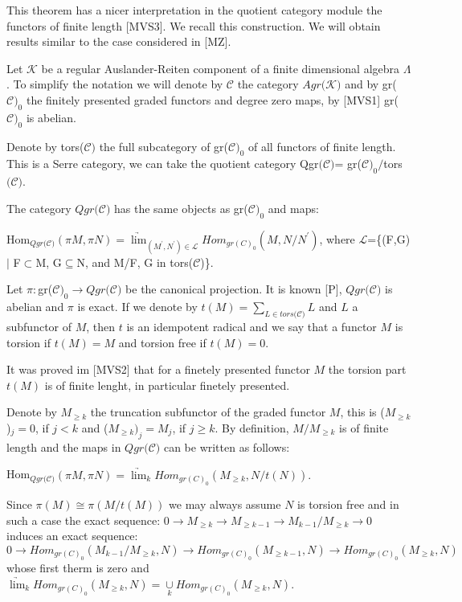 \documentclass{amsart}
\theoremstyle{plain}
\numberwithin{equation}{section}
\begin{document}
This theorem has a nicer interpretation in the quotient category module the
functors of finite length [MVS3]. We recall this construction. We will
obtain results similar to the case considered in [MZ].

\bigskip Let $\mathcal{K}$ be a regular Auslander-Reiten component of a
finite dimensional algebra $\Lambda $. To simplify the notation we will
denote by $\mathcal{C}$ the category $Agr(\mathcal{K)}$ and by gr($\mathcal{C)}_{0}$ the finitely presented graded functors and degree zero maps, by
[MVS1] gr($\mathcal{C)}_{0}$ is abelian.

Denote by tors($\mathcal{C)}$ the full subcategory of gr($\mathcal{C)}_{0}$
of all functors of finite length. This is a Serre category, we can take the
quotient category Qgr$(\mathcal{C)}$= gr($\mathcal{C)}_{0}/$tors$(\mathcal{C)}$.

The category $Qgr(\mathcal{C)}$ has the same objects as gr($\mathcal{C)}_{0}$
and maps:

Hom$_{Qgr(\mathcal{C)}}(\pi M,\pi N)=\underrightarrow{\lim }_{(M^{\prime
},N^{\prime })\in \mathcal{L}}Hom_{gr(C)_{0}}(M{\acute{}},N/N^{\prime })$, where $\mathcal{L}$=\{(F,G)$\mid $\newline
F$\subset $M, G$\subseteq $N, and M/F, G in tors($\mathcal{C}$)\}.

Let $\pi :$gr($\mathcal{C)}_{0}\rightarrow Qgr(\mathcal{C)}$ be the
canonical projection. It is known [P], $Qgr(\mathcal{C)}$ is abelian and $\pi $ is exact. If we denote by $t(M)=\underset{L\in tors(\mathcal{C)}}{\sum
}L$ and $L$ a subfunctor of $M$, then $t$ is an idempotent radical and we
say that a functor $M$ is torsion if $t(M)=M$ and torsion free if $t(M)=0.$

It was proved im [MVS2] that for a finetely presented functor $M$ the
torsion part $t(M)$ is of finite lenght, in particular finetely presented.

Denote by $M_{\geq k}$ the truncation subfunctor of the graded functor $M$,
this is ($M_{\geq k}$)$_{j}=$0, if $j<k$ and ($M_{\geq k})_{j}=M_{j}$, if $j\geq k$. By definition, $M/M_{\geq k}$ is of finite length and the maps in $Qgr(\mathcal{C)}$ can be written as follows:

Hom$_{Qgr(\mathcal{C)}}(\pi M,\pi N)=\underrightarrow{\lim }_{k}Hom_{gr(C)_{0}}(M_{\geq k},N/t(N)).$

Since $\pi (M)\cong \pi (M/t(M))$ we may always assume $N$ is torsion free
and in such a case the exact sequence: $0\rightarrow M_{\geq k}\rightarrow
M_{\geq k-1}\rightarrow M_{k-1}/M_{\geq k}\rightarrow 0$ induces an exact
sequence: $0\rightarrow Hom_{gr(C)_{0}}(M_{k-1}/M_{\geq k},N)\rightarrow
Hom_{gr(C)_{0}}(M_{\geq k-1},N)\rightarrow Hom_{gr(C)_{0}}(M_{\geq k},N)$
whose first therm is zero and $\underrightarrow{\lim }_{k}Hom_{gr(C)_{0}}(M_{\geq k},N)=\underset{k}{\cup }Hom_{gr(C)_{0}}(M_{\geq
k},N)$.
\end{document}
